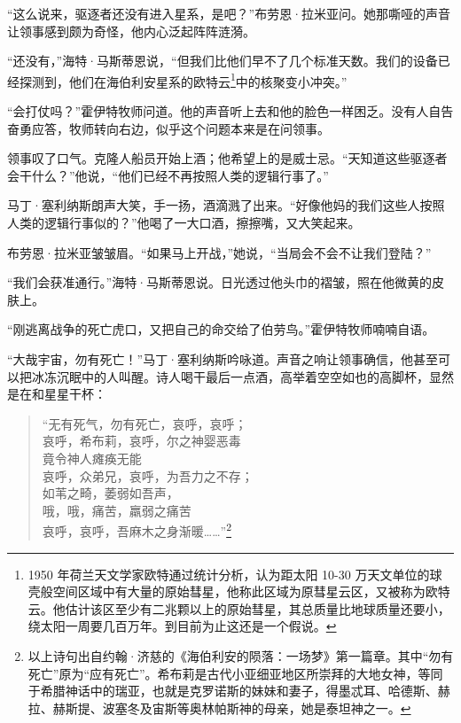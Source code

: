 \documentclass[AutoFakeBold=true]{book}
\begin{document}
\vspace*{1em}

``这么说来，驱逐者还没有进入星系，是吧？''布劳恩·拉米亚问。她那嘶哑的声音让领事感到颇为奇怪，他内心泛起阵阵涟漪。

``还没有，''海特·马斯蒂恩说，``但我们比他们早不了几个标准天数。我们的设备已经探测到，他们在海伯利安星系的欧特云\footnote{1950 年荷兰天文学家欧特通过统计分析，认为距太阳 10-30 万天文单位的球壳般空间区域中有大量的原始彗星，他称此区域为原彗星云区，又被称为欧特云。他估计该区至少有二兆颗以上的原始彗星，其总质量比地球质量还要小，绕太阳一周要几百万年。到目前为止这还是一个假说。}中的核聚变小冲突。''

``会打仗吗？''霍伊特牧师问道。他的声音听上去和他的脸色一样困乏。没有人自告奋勇应答，牧师转向右边，似乎这个问题本来是在问领事。

领事叹了口气。克隆人船员开始上酒；他希望上的是威士忌。``天知道这些驱逐者会干什么？''他说，``他们已经不再按照人类的逻辑行事了。''

马丁·塞利纳斯朗声大笑，手一扬，酒滴溅了出来。``好像他妈的我们这些人按照人类的逻辑行事似的？''他喝了一大口酒，擦擦嘴，又大笑起来。

布劳恩·拉米亚皱皱眉。``如果马上开战，''她说，``当局会不会不让我们登陆？''

``我们会获准通行。''海特·马斯蒂恩说。日光透过他头巾的褶皱，照在他微黄的皮肤上。

``刚逃离战争的死亡虎口，又把自己的命交给了伯劳鸟。''霍伊特牧师喃喃自语。

``大哉宇宙，勿有死亡！''马丁·塞利纳斯吟咏道。声音之响让领事确信，他甚至可以把冰冻沉眠中的人叫醒。诗人喝干最后一点酒，高举着空空如也的高脚杯，显然是在和星星干杯：

\begin{quote}
	{\kaishu ``无有死气，勿有死亡，哀呼，哀呼；\\
	哀呼，希布莉，哀呼，尔之神婴恶毒\\
	竟令神人瘫痪无能\\
	哀呼，众弟兄，哀呼，为吾力之不存；\\
	如苇之畸，萎弱如吾声，\\
	哦，哦，痛苦，羸弱之痛苦\\
	哀呼，哀呼，吾麻木之身渐暖……''}\footnote{以上诗句出自约翰·济慈的《海伯利安的陨落：一场梦》第一篇章。其中``勿有死亡''原为``应有死亡''。希布莉是古代小亚细亚地区所崇拜的大地女神，等同于希腊神话中的瑞亚，也就是克罗诺斯的妹妹和妻子，得墨忒耳、哈德斯、赫拉、赫斯提、波塞冬及宙斯等奥林帕斯神的母亲，她是泰坦神之一。}
\end{quote}
\end{document}
